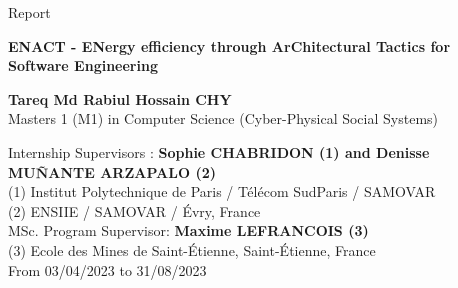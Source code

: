 \documentclass[a4paper,11pt,english,openany]{book}
\begin{document}
\thispagestyle{empty}

\begin{center}
\vfill

\vspace{4cm} 
\begin{Large}
Report
\end{Large}

\vspace{4cm}
{\textbf{\huge
ENACT - ENergy efficiency through ArChitectural Tactics for Software Engineering}}

\vspace{2cm} 
{\textbf{\large Tareq Md Rabiul Hossain CHY}}\\
Masters 1 (M1) in Computer Science (Cyber-Physical Social Systems)

\vspace{1cm}             
Internship Supervisors : {\textbf{\large Sophie CHABRIDON (1) and Denisse MU\~NANTE ARZAPALO (2)}}\\

(1) Institut Polytechnique de Paris / Télécom SudParis / SAMOVAR\\
(2) ENSIIE / SAMOVAR / \'Evry, France\\


\vspace{1 cm}
MSc. Program Supervisor:
\vspace{0.1 cm}
\textbf{Maxime LEFRANCOIS (3)}\\ 
\vspace{0.1 cm} 
(3) Ecole des Mines de Saint-Étienne, Saint-Étienne, France\\

\vspace{1cm}
From 03/04/2023 to 31/08/2023\\

\vfill


\end{center}
\end{document}
